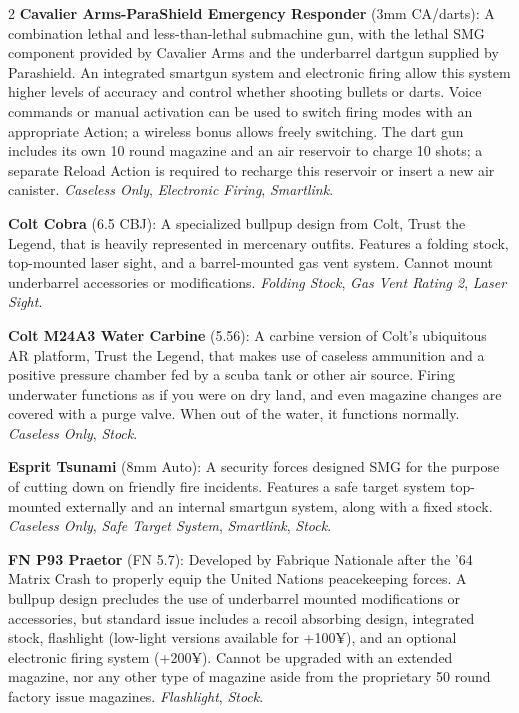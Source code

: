 \documentclass[
  oneside]{article}
\begin{document}
\begin{multicols}{2}
\textbf{Cavalier Arms-ParaShield Emergency
Responder} (3mm CA/darts): A combination lethal
and less-than-lethal submachine gun, with the
lethal SMG component provided by Cavalier Arms and
the underbarrel dartgun supplied by Parashield. An
integrated smartgun system and electronic firing
allow this system higher levels of accuracy and
control whether shooting bullets or darts. Voice
commands or manual activation can be used to
switch firing modes with an appropriate Action; a
wireless bonus allows freely switching. The dart
gun includes its own 10 round magazine and an air
reservoir to charge 10 shots; a separate Reload
Action is required to recharge this reservoir or
insert a new air canister. \emph{Caseless Only},
\emph{Electronic Firing}, \emph{Smartlink}.

\textbf{Colt Cobra} (6.5 CBJ): A specialized
bullpup design from Colt, Trust the Legend, that
is heavily represented in mercenary outfits.
Features a folding stock, top-mounted laser sight,
and a barrel-mounted gas vent system. Cannot mount
underbarrel accessories or modifications.
\emph{Folding Stock}, \emph{Gas Vent Rating 2},
\emph{Laser Sight}.

\textbf{Colt M24A3 Water Carbine} (5.56): A
carbine version of Colt's ubiquitous AR platform,
Trust the Legend, that makes use of caseless
ammunition and a positive pressure chamber fed by
a scuba tank or other air source. Firing
underwater functions as if you were on dry land,
and even magazine changes are covered with a purge
valve. When out of the water, it functions
normally. \emph{Caseless Only}, \emph{Stock}.

\textbf{Esprit Tsunami} (8mm Auto): A security
forces designed SMG for the purpose of cutting
down on friendly fire incidents. Features a safe
target system top-mounted externally and an
internal smartgun system, along with a fixed
stock. \emph{Caseless Only}, \emph{Safe Target
System}, \emph{Smartlink}, \emph{Stock}.

\textbf{FN P93 Praetor} (FN 5.7): Developed by
Fabrique Nationale after the '64 Matrix Crash to
properly equip the United Nations peacekeeping
forces. A bullpup design precludes the use of
underbarrel mounted modifications or accessories,
but standard issue includes a recoil absorbing
design, integrated stock, flashlight (low-light
versions available for +100¥), and an optional
electronic firing system (+200¥). Cannot be
upgraded with an extended magazine, nor any other
type of magazine aside from the proprietary 50
round factory issue magazines. \emph{Flashlight},
\emph{Stock}.


\end{multicols}
\end{document}
